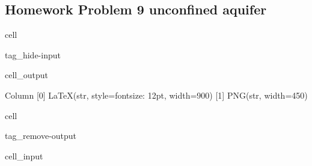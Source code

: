 \documentclass[letterpaper,10pt,english]{jupyterBook}
\begin{document}
\subsection{Homework Problem 9 \sphinxhyphen{} unconfined aquifer}
\label{\detokenize{content/tutorials/T6/tutorial_06:homework-problem-9-unconfined-aquifer}}
\begin{sphinxuseclass}{cell}
\begin{sphinxuseclass}{tag_hide-input}\begin{sphinxVerbatimOutput}

\begin{sphinxuseclass}{cell_output}
\begin{sphinxVerbatim}[commandchars=\\\{\}]
Column
    [0] LaTeX(str, style=\PYGZob{}\PYGZsq{}font\PYGZhy{}size\PYGZsq{}: \PYGZsq{}12pt\PYGZsq{}\PYGZcb{}, width=900)
    [1] PNG(str, width=450)
\end{sphinxVerbatim}

\end{sphinxuseclass}\end{sphinxVerbatimOutput}

\end{sphinxuseclass}
\end{sphinxuseclass}
\sphinxstepscope

\begin{sphinxuseclass}{cell}
\begin{sphinxuseclass}{tag_remove-output}\begin{sphinxVerbatimInput}

\begin{sphinxuseclass}{cell_input}
\begin{sphinxVerbatim}[commandchars=\\\{\}]
   
   
    
   
\end{sphinxVerbatim}

\end{sphinxuseclass}\end{sphinxVerbatimInput}

\end{sphinxuseclass}
\end{sphinxuseclass}
\end{document}
